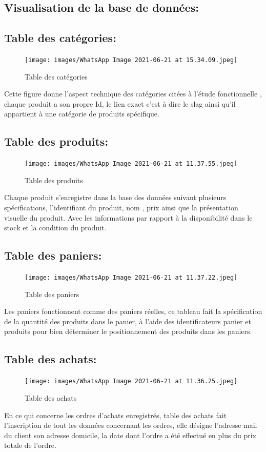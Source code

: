\documentclass[a4paper]{report}
\begin{document}
\begin{doublespace}
\begin{doublespace}
\begin{doublespace}
\begin{doublespace}
\begin{doublespace}
\begin{doublespace}
\section{ Visualisation de la base de données:}
 \subsection{ Table des catégories: } 
\begin{figure}[H]
 \texttt{[image: images/WhatsApp Image 2021-06-21 at 15.34.09.jpeg]}
 \caption{Table des catégories}
\end{figure}
Cette figure donne l'aspect technique des catégories citées à l'étude 
fonctionnelle , chaque produit a son propre Id, le lien exact c'est à dire le slag ainsi qu'il appartient à une catégorie de produits spécifique. 
\subsection{ Table des produits: } 
\begin{figure}[H]

 \texttt{[image: images/WhatsApp Image 2021-06-21 at 11.37.55.jpeg]}
 \caption{Table des produits}
\end{figure}  
Chaque produit s'enregistre dans la base des données suivant plusieurs spécifications, l'identifiant du produit, nom , prix ainsi que la présentation visuelle du produit. Avec les informations par rapport à la disponibilité dans le stock et la condition du produit.
\subsection{ Table des paniers: } 
\begin{figure}[H]

 \texttt{[image: images/WhatsApp Image 2021-06-21 at 11.37.22.jpeg]}
 \caption{Table des paniers}
\end{figure}    
Les paniers fonctionnent comme des paniers réelles, ce tableau fait la spécification de la quantité des produits dans le panier,  à l'aide des identificateurs panier et produits pour bien déterminer le positionnement des produits dans les paniers.
 \subsection{ Table des achats: } 
\begin{figure}[H]

 \texttt{[image: images/WhatsApp Image 2021-06-21 at 11.36.25.jpeg]}
 \caption{Table des achats}
\end{figure} 
En ce qui concerne les ordres d'achats enregistrés, table  des achats fait l'inscription de tout les données concernant les ordres, elle désigne l'adresse mail du client son adresse domicile, la  date dont l'ordre a été effectué en plus du prix totale de l'ordre.

\end{doublespace}
\end{doublespace}
\end{doublespace}
\end{doublespace}
\end{doublespace}
\end{doublespace}
\end{document}
